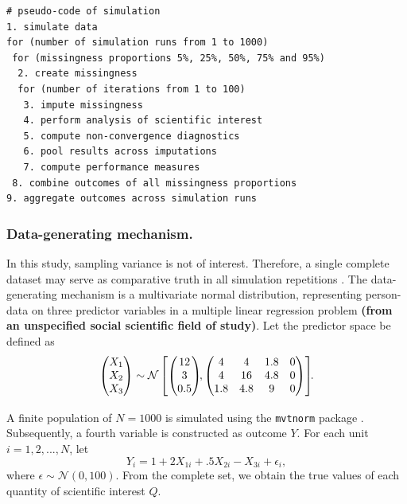 \documentclass[Royal,times,sageh]{sagej}
\begin{document}
\begin{verbatim}
# pseudo-code of simulation 
1. simulate data 
for (number of simulation runs from 1 to 1000)
 for (missingness proportions 5%, 25%, 50%, 75% and 95%)
  2. create missingness
  for (number of iterations from 1 to 100)
   3. impute missingness
   4. perform analysis of scientific interest
   5. compute non-convergence diagnostics 
   6. pool results across imputations
   7. compute performance measures
 8. combine outcomes of all missingness proportions
9. aggregate outcomes across simulation runs 
\end{verbatim}

\hypertarget{data-generating-mechanism.}{%
\subsubsection{Data-generating
mechanism.}\label{data-generating-mechanism.}}

In this study, sampling variance is not of interest. Therefore, a single
complete dataset may serve as comparative truth in all simulation
repetitions \citep{vink14}. The data-generating mechanism is a
multivariate normal distribution, representing person-data on three
predictor variables in a multiple linear regression problem
\textbf{(from an unspecified social scientific field of study)}. Let the
predictor space be defined as \[
\begin{aligned}
\begin{pmatrix}X_1\\
X_2\\
X_3
\end{pmatrix} \sim \mathcal{N}
\begin{bmatrix}
\begin{pmatrix}
12\\
3\\
0.5
\end{pmatrix}\!\!,
\begin{pmatrix}
4 & 4 & 1.8 & 0\\
4 & 16 & 4.8 & 0\\
1.8 & 4.8 & 9 & 0
\end{pmatrix}
\end{bmatrix}\!\!\text{.}\\[2\jot]
\end{aligned}
\] A finite population of \(N=1000\) is simulated using the
\texttt{mvtnorm} package \citep{mvtnorm}. Subsequently, a fourth
variable is constructed as outcome \(Y\). For each unit
\(i = 1, 2,..., N\), let \[
Y_i = 1 + 2X_{1i} +.5X_{2i} - X_{3i} + \epsilon_i ,
\] where \(\epsilon \sim \mathcal{N}(0, 100)\). From the complete set,
we obtain the true values of each quantity of scientific interest \(Q\).
\end{document}
